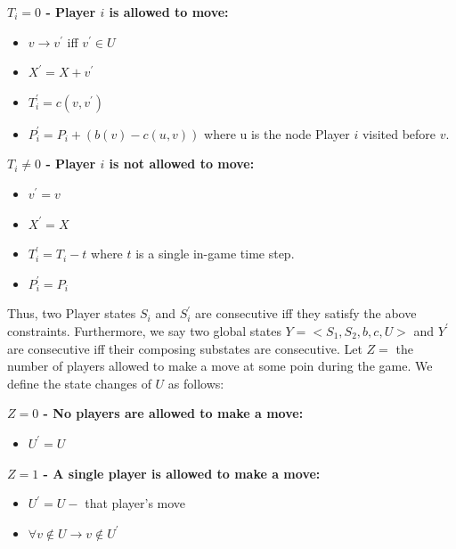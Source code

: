 \documentclass[pageno]{jpaper}
\begin{document}
\textbf{$T_i = 0$ - Player $i$ is allowed to move:}\newline

\begin{itemize}
	\item $v \rightarrow v^{\prime}$ iff $v^{\prime} \in U$
	\item $X^{\prime} = X + v^{\prime}$
	\item $T_{i}^{\prime} = c(v, v^{\prime})$
	\item $P_{i}^{\prime} = P_i + (b(v) - c(u,v))$ where u is the node Player $i$ visited before $v$.\newline
\end{itemize}

\textbf{$T_i \neq 0$ - Player $i$ is not allowed to move:}\newline

\begin{itemize}
	\item $v^{\prime} = v$
	\item $X^{\prime} = X$
	\item $T_{i}^{\prime} = T_i - t$ where $t$ is a single in-game time step.
	\item $P_{i}^{\prime} = P_i$
\end{itemize}

Thus, two Player states $S_i$ and $S_i^{\prime}$ are consecutive iff they satisfy the above constraints. Furthermore, we say two global states $Y = <S_1, S_2, b, c, U>$ and $Y^{\prime}$ are consecutive iff their composing substates are consecutive. Let $Z = $ the number of players allowed to make a move at some poin during the game. We define the state changes of $U$ as follows:\newline

\textbf{$Z = 0$ - No players are allowed to make a move:}\newline

\begin{itemize}
	\item $U^{\prime} = U$\newline
\end{itemize}

\textbf{$Z = 1$ - A single player is allowed to make a move:}\newline

\begin{itemize}
	\item $U^{\prime}= U - $ that player's move
	\item $\forall v \notin U \rightarrow v \notin U^{\prime}$
\end{itemize}
\end{document}
